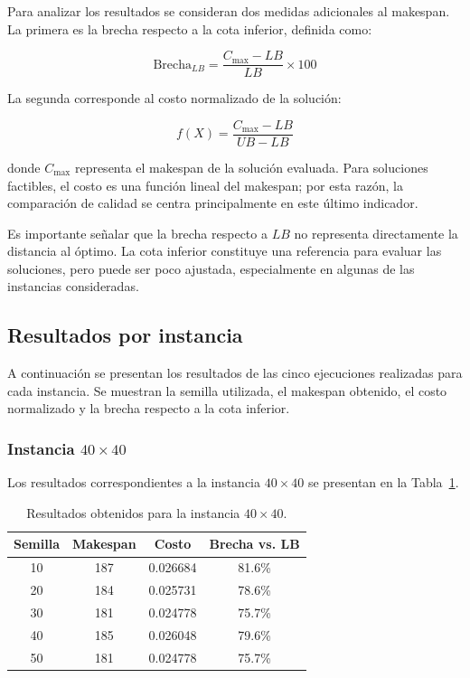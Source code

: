 \documentclass[12pt,a4paper]{article}
\begin{document}
Para analizar los resultados se consideran dos medidas adicionales al makespan. La primera es la brecha respecto a la cota inferior, definida como:

\[
    \text{Brecha}_{LB} =
    \frac{C_{\max}-LB}{LB}\times 100
\]

La segunda corresponde al costo normalizado de la solución:

\[
    f(X) =
    \frac{C_{\max}-LB}{UB-LB}
\]

donde $C_{\max}$ representa el makespan de la solución evaluada. Para soluciones factibles, el costo es una función lineal del makespan; por esta razón, la comparación de calidad se centra principalmente en este último indicador.

Es importante señalar que la brecha respecto a $LB$ no representa directamente la distancia al óptimo. La cota inferior constituye una referencia para evaluar las soluciones, pero puede ser poco ajustada, especialmente en algunas de las instancias consideradas.

\subsection{Resultados por instancia}
\label{subsec:resultados-instancia}

A continuación se presentan los resultados de las cinco ejecuciones realizadas para cada instancia. Se muestran la semilla utilizada, el makespan obtenido, el costo normalizado y la brecha respecto a la cota inferior.

\subsubsection{Instancia $40 \times 40$}

Los resultados correspondientes a la instancia $40 \times 40$ se presentan en la Tabla~\ref{tab:resultados-40x40}.

\begin{table}[H]
    \centering
    \caption{Resultados obtenidos para la instancia $40 \times 40$.}
    \label{tab:resultados-40x40}
    \begin{tabular}{cccc}
        \hline
        \textbf{Semilla} & \textbf{Makespan} & \textbf{Costo} & \textbf{Brecha vs. LB} \\
        \hline
        10 & 187 & 0.026684 & 81.6\% \\
        20 & 184 & 0.025731 & 78.6\% \\
        30 & 181 & 0.024778 & 75.7\% \\
        40 & 185 & 0.026048 & 79.6\% \\
        50 & 181 & 0.024778 & 75.7\% \\
        \hline
    \end{tabular}
\end{table}
\end{document}
